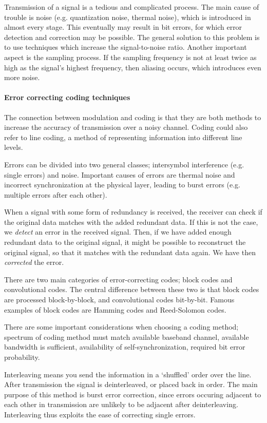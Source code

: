 \documentclass[11pt,titlepage]{report}
\begin{document}
Transmission of a signal is a tedious and complicated process. The main cause of trouble is noise (e.g. quantization noise, thermal noise), which is introduced in almost every stage. This eventually may result in bit errors, for which error detection and correction may be possible. The general solution to this problem is to use techniques which increase the signal-to-noise ratio. Another important aspect is the sampling process. If the sampling frequency is not at least twice as high as the signal's highest frequency, then aliasing occurs, which introduces even more noise.

\paragraph{Error correcting coding techniques}
The connection between modulation and coding is that they are both methods to increase the accuracy of transmission over a noisy channel. Coding could also refer to line coding, a method of representing information into different line levels.

Errors can be divided into two general classes; intersymbol interference (e.g. single errors) and noise. Important causes of errors are thermal noise and incorrect synchronization at the physical layer, leading to burst errors (e.g. multiple errors after each other).

When a signal with some form of redundancy is received, the receiver can check if the original data matches with the added redundant data. If this is not the case, we \emph{detect} an error in the received signal. Then, if we have added enough redundant data to the original signal, it might be possible to reconstruct the original signal, so that it matches with the redundant data again. We have then \emph{corrected} the error.

There are two main categories of error-correcting codes; block codes and convolutional codes. The central difference between these two is that block codes are processed block-by-block, and convolutional codes bit-by-bit. Famous examples of block codes are Hamming codes and Reed-Solomon codes. 

There are some important considerations when choosing a coding method; spectrum of coding method must match available baseband channel, available bandwidth is sufficient, availability of self-synchronization, required bit error probability.

Interleaving means you send the information in a `shuffled' order over the line. After transmission the signal is deinterleaved, or placed back in order. The main purpose of this method is burst error correction, since errors occuring adjacent to each other in transmission are unlikely to be adjacent after deinterleaving. Interleaving thus exploits the ease of correcting single errors.
\end{document}
